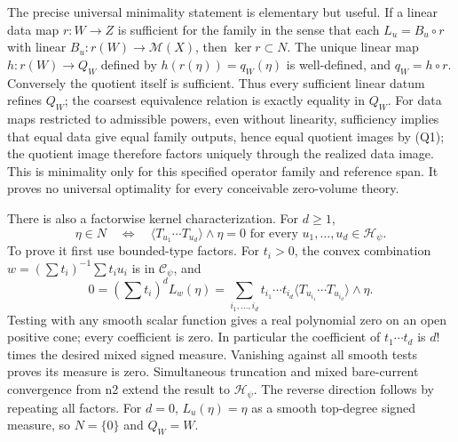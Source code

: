 \documentclass[
  11pt,
]{article}
\begin{document}
The precise universal minimality statement is elementary but useful. If
a linear data map \(r:W\to Z\) is sufficient for the family in the sense
that each \(L_u=B_u\circ r\) with linear \(B_u:r(W)\to\mathcal M(X)\),
then \(\ker r\subset N\). The unique linear map \(h:r(W)\to Q_W\)
defined by \(h(r(\eta))=q_W(\eta)\) is well-defined, and
\(q_W=h\circ r\). Conversely the quotient itself is sufficient. Thus
every sufficient linear datum refines \(Q_W\); the coarsest equivalence
relation is exactly equality in \(Q_W\). For data maps restricted to
admissible powers, even without linearity, sufficiency implies that
equal data give equal family outputs, hence equal quotient images by
(Q1); the quotient image therefore factors uniquely through the realized
data image. This is minimality only for this specified operator family
and reference span. It proves no universal optimality for every
conceivable zero-volume theory.

There is also a factorwise kernel characterization. For \(d\geq1\), \[
\eta\in N\quad\Longleftrightarrow\quad
\langle T_{u_1}\cdots T_{u_d}\rangle\wedge\eta=0
\text{ for every }u_1,\ldots,u_d\in\mathcal H_\psi. \tag{Q2}
\] To prove it first use bounded-type factors. For \(t_i>0\), the convex
combination \(w=(\sum t_i)^{-1}\sum t_iu_i\) is in \(\mathcal C_\psi\),
and \[
0=(\sum t_i)^d L_w(\eta)
=\sum_{i_1,\ldots,i_d}t_{i_1}\cdots t_{i_d}
\langle T_{u_{i_1}}\cdots T_{u_{i_d}}\rangle\wedge\eta.
\] Testing with any smooth scalar function gives a real polynomial zero
on an open positive cone; every coefficient is zero. In particular the
coefficient of \(t_1\cdots t_d\) is \(d!\) times the desired mixed
signed measure. Vanishing against all smooth tests proves its measure is
zero. Simultaneous truncation and mixed bare-current convergence from n2
extend the result to \(\mathcal H_\psi\). The reverse direction follows
by repeating all factors. For \(d=0\), \(L_u(\eta)=\eta\) as a smooth
top-degree signed measure, so \(N=\{0\}\) and \(Q_W=W\).
\end{document}
